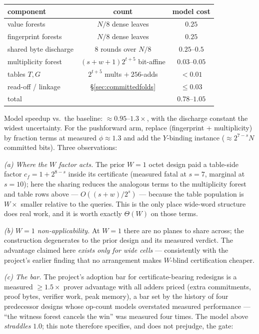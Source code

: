 \documentclass[11pt]{article}
\theoremstyle{definition}
\begin{document}
\begin{center}
\begin{tabular}{@{}lcc@{}}
\toprule
component & count & model cost \\
\midrule
value forests & $N/8$ dense leaves & $0.25$ \\
fingerprint forests & $N/8$ dense leaves & $0.25$ \\
shared byte discharge & $8$ rounds over $N/8$ & $0.25$--$0.5$ \\
multiplicity forest & $(s{+}w{+}1)2^{t+5}$ bit-affine & $0.03$--$0.05$ \\
tables $T,G$ & $2^{t+5}$ mults $+\ 256$-adds & $<0.01$ \\
read-off / linkage & \S\ref{sec:committedfolds} & $\le 0.03$ \\
\midrule
total & & $0.78$--$1.05$ \\
\bottomrule
\end{tabular}
\end{center}

\noindent
Model speedup vs.\ the baseline: $\approx 0.95$--$1.3\times$, with the
discharge constant the widest uncertainty. For the pushforward arm,
replace (fingerprint + multiplicity) by fraction terms at measured
$\phi\approx 1.3$ and add the $Y$-binding instance
($\approx 2^{7-s}N$ committed bits). Three observations:

\emph{(a) Where the $W$ factor acts.} The prior $W{=}1$ octet design paid
a table-side factor $c_f = 1+2^{8-s}$ inside its certificate (measured
fatal at $s{=}7$, marginal at $s{=}10$); here the sharing reduces the
analogous terms to the multiplicity forest and table rows above ---
$O((s{+}w)/2^s)$ --- because the table population is $W\times$ smaller
relative to the queries. This is the only place wide-word structure
does real work, and it is worth exactly $\Theta(W)$ on those terms.

\emph{(b) $W=1$ non-applicability.} At $W=1$ there are no planes to
share across; the construction degenerates to the prior design and its
measured verdict. The advantage claimed here \emph{exists only for wide
cells} --- consistently with the project's earlier finding that no
arrangement makes $W$-blind certification cheaper.

\emph{(c) The bar.} The project's adoption bar for certificate-bearing
redesigns is a measured $\ge 1.5\times$ prover advantage with all adders
priced (extra commitments, proof bytes, verifier work, peak memory), a
bar set by the history of four predecessor designs whose op-count models
overstated measured performance --- ``the witness forest cancels the
win'' was measured four times. The model above \emph{straddles} $1.0$;
this note therefore specifies, and does not prejudge, the gate:
\end{document}
